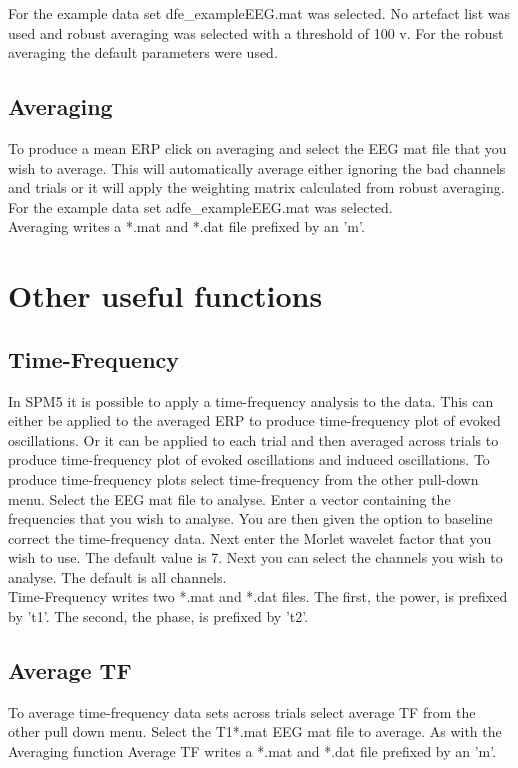 For the example data set dfe\_exampleEEG.mat was selected. No artefact
list was used and robust averaging was selected with a threshold of
100  v. For the robust averaging the default parameters were used.

\subsection{Averaging}
To produce a mean ERP click on averaging and select the EEG mat file
that you wish to average. This will automatically average either
ignoring the bad channels and trials or it will apply the weighting
matrix calculated from robust averaging. For the example data set
adfe\_exampleEEG.mat was selected.\\

Averaging writes a *.mat and *.dat file prefixed by an 'm'. 

\section{Other useful functions}
\subsection{Time-Frequency}
In SPM5 it is possible to apply a time-frequency analysis to the
data. This can either be applied to the averaged ERP to produce
time-frequency plot of evoked oscillations. Or it can be applied to
each trial and then averaged across trials to produce time-frequency
plot of evoked oscillations and induced oscillations. To produce
time-frequency plots select time-frequency from the other pull-down
menu. Select the EEG mat file to analyse. Enter a vector containing
the frequencies that you wish to analyse. You are then given the
option to baseline correct the time-frequency data. Next enter the
Morlet wavelet factor that you wish to use. The default value is
7. Next you can select the channels you wish to analyse. The default
is all channels.\\

Time-Frequency writes two *.mat and *.dat files. The first, the power,
is prefixed by 't1'. The second, the phase, is  prefixed by 't2'.

\subsection{Average TF}
To average time-frequency data sets across trials select average TF
from the other pull down menu. Select the T1*.mat EEG mat file to
average. As with the Averaging function Average TF writes a *.mat and
*.dat file prefixed by an 'm'.